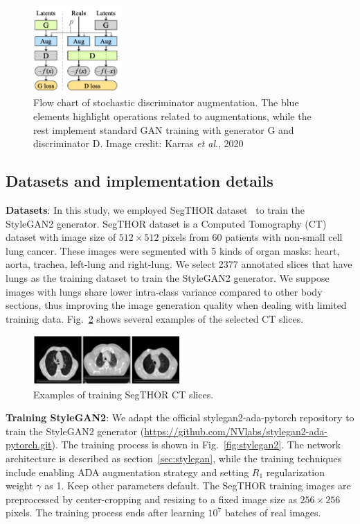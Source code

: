 \documentclass[conference]{IEEEtran}
\newcommand{\etal}{\textit{et al}.}
\begin{document}
\begin{figure}[!ht]
  \centering
  \includegraphics[width=0.3\textwidth]{./fig/ada.png} 
  \caption{Flow chart of stochastic discriminator augmentation. The blue elements highlight operations related to augmentations, while the rest implement standard GAN training with generator G and discriminator D.
  Image credit: Karras \etal, 2020\cite{karras2020training}}
  \label{fig:ada}
\end{figure}

\subsection{Datasets and implementation details}
\label{sec:impl}
\noindent \textbf{Datasets}:
In this study, we employed SegTHOR dataset~\cite{Lambert2020SegTHORSO} to train the StyleGAN2 generator. SegTHOR dataset is a Computed Tomography (CT) dataset with image size of $512\times 512$ pixels from 60 patients with non-small cell lung cancer. 
These images were segmented with 5 kinds of organ masks: heart, aorta, trachea, left-lung and right-lung. 
We select 2377 annotated slices that have lungs as the training dataset to train the StyleGAN2 generator. We suppose images with lungs share lower intra-class variance compared to other body sections, thus improving the image generation quality when dealing with limited training data. Fig.~\ref{fig:real_data} shows several examples of the selected CT slices. 

\begin{figure}[h]
    \centering
    \includegraphics[width=0.5\textwidth]{./fig/real_sample.png}
    \caption{Examples of training SegTHOR CT slices.}
    \label{fig:real_data}
\end{figure}

\noindent \textbf{Training StyleGAN2}:
\label{sec:train_gan}
We adapt the official stylegan2-ada-pytorch repository to train the StyleGAN2 generator (\url{https://github.com/NVlabs/stylegan2-ada-pytorch.git}). The training process is shown in Fig.~\ref{fig:stylegan2}. The network architecture is described as section~\ref{sec:stylegan}, while the training techniques include enabling ADA augmentation strategy and setting $R_1$ regularization weight $\gamma$ as 1. Keep other parameters default. The SegTHOR training images are preprocessed by center-cropping and resizing to a fixed image size as $256\times 256$ pixels. The training process ends after learning $10^7$ batches of real images. 
\end{document}
